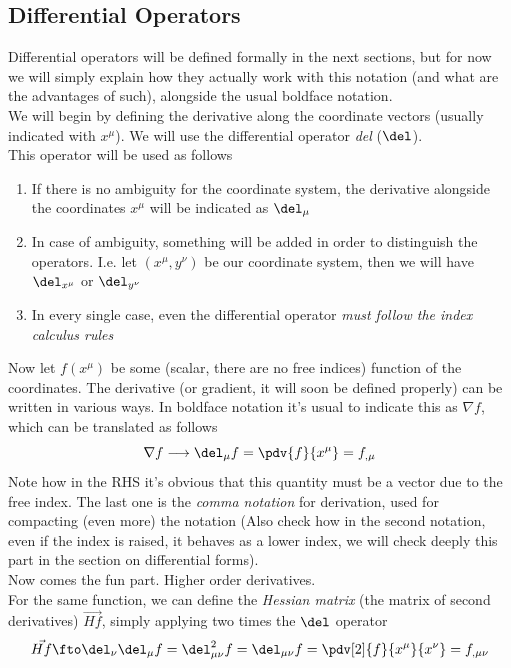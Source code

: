 \documentclass[../mmf.tex]{subfiles}
\begin{document}
\subsection{Differential Operators}
Differential operators will be defined formally in the next sections, but for now we will simply explain how they actually work with this notation (and what are the advantages of such), alongside the usual boldface notation.\\
We will begin by defining the derivative along the coordinate vectors (usually indicated with $x^\mu$). We will use the differential operator \textit{del} ($\del$).\\
This operator will be used as follows
\begin{enumerate}
\item If there is no ambiguity for the coordinate system, the derivative alongside the coordinates $x^\mu$ will be indicated as $\del_\mu$
\item In case of ambiguity, something will be added in order to distinguish the operators. I.e. let $(x^\mu,y^\nu)$ be our coordinate system, then we will have $\del_{x^\mu}$ or $\del_{y^\nu}$
\item In every single case, even the differential operator \emph{must follow the index calculus rules}
\end{enumerate}
Now let $f(x^\mu)$ be some (scalar, there are no free indices) function of the coordinates. The derivative (or gradient, it will soon be defined properly) can be written in various ways. In boldface notation it's usual to indicate this as $\nabla f$, which can be translated as follows
\begin{equation}
	\nabla f\longrightarrow\del_\mu f=\pdv{f}{x^\mu}=f_{,\mu}
	\label{eq:derivationenot}
\end{equation}
Note how in the RHS it's obvious that this quantity must be a vector due to the free index. The last one is the \textit{comma notation} for derivation, used for compacting (even more) the notation (Also check how in the second notation, even if the index is raised, it behaves as a lower index, we will check deeply this part in the section on differential forms).\\
Now comes the fun part. Higher order derivatives.\\
For the same function, we can define the \textit{Hessian matrix} (the matrix of second derivatives) $\vec{Hf}$, simply applying two times the $\del$ operator
\begin{equation}
	\vec{Hf}\fto\del_\nu\del_\mu f=\del^2_{\mu\nu}f=\del_{\mu\nu}f=\pdv[2]{f}{x^\mu}{x^\nu}=f_{,\mu\nu}
	\label{eq:hessianenot}
\end{equation}
\end{document}
